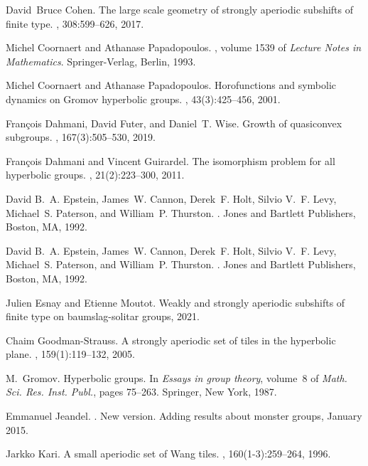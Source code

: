 \documentclass[12pt,reqno]{amsart}
\theoremstyle{plain}
\theoremstyle{definition}
\numberwithin{subcase}{case}
\theoremstyle{plain}
\theoremstyle{definition}
\begin{document}
\begin{thebibliography}{10}
David~Bruce Cohen.
\newblock The large scale geometry of strongly aperiodic subshifts of finite
  type.
, 308:599--626, 2017.

Michel Coornaert and Athanase Papadopoulos.
, volume 1539 of {\em
  Lecture Notes in Mathematics}.
\newblock Springer-Verlag, Berlin, 1993.

Michel Coornaert and Athanase Papadopoulos.
\newblock Horofunctions and symbolic dynamics on {G}romov hyperbolic groups.
, 43(3):425--456, 2001.

Fran\c{c}ois Dahmani, David Futer, and Daniel~T. Wise.
\newblock Growth of quasiconvex subgroups.
, 167(3):505--530, 2019.

Fran\c{c}ois Dahmani and Vincent Guirardel.
\newblock The isomorphism problem for all hyperbolic groups.
, 21(2):223--300, 2011.

David B.~A. Epstein, James~W. Cannon, Derek~F. Holt, Silvio V.~F. Levy,
  Michael~S. Paterson, and William~P. Thurston.
.
\newblock Jones and Bartlett Publishers, Boston, MA, 1992.

David B.~A. Epstein, James~W. Cannon, Derek~F. Holt, Silvio V.~F. Levy,
  Michael~S. Paterson, and William~P. Thurston.
.
\newblock Jones and Bartlett Publishers, Boston, MA, 1992.

Julien Esnay and Etienne Moutot.
\newblock Weakly and strongly aperiodic subshifts of finite type on
  baumslag-solitar groups, 2021.

Chaim Goodman-Strauss.
\newblock A strongly aperiodic set of tiles in the hyperbolic plane.
, 159(1):119--132, 2005.

M.~Gromov.
\newblock Hyperbolic groups.
\newblock In {\em Essays in group theory}, volume~8 of {\em Math. Sci. Res.
  Inst. Publ.}, pages 75--263. Springer, New York, 1987.

Emmanuel Jeandel.
.
\newblock New version. Adding results about monster groups, January 2015.

Jarkko Kari.
\newblock A small aperiodic set of {W}ang tiles.
, 160(1-3):259--264, 1996.


\end{thebibliography}
\end{document}
